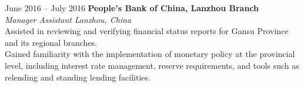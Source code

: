 \documentclass[a4paper,12pt]{article}
\makeatletter
\newenvironment{joblong}[2]
    {
    \begin{tabularx}{\linewidth}{@{}l X r@{}}
    \textbf{#1} & \hfill &  #2 \\[3.75pt]
    \end{tabularx}
    \begin{minipage}[t]{\linewidth}
    \begin{itemize}[nosep,after=\strut, leftmargin=1em, itemsep=3pt,label=--]
    }
    {
    \end{itemize}
    \end{minipage}    
    }
\makeatother
\begin{document}
June 2016 -- July 2016 \hfill \textbf{People’s Bank of China, Lanzhou Branch} \\ %
\textit{Manager Assistant} \hfill \textit{Lanzhou, China} \\
\textbullet Assisted in reviewing and verifying financial status reports for Gansu Province and its regional branches. \\
\textbullet Gained familiarity with the implementation of monetary policy at the provincial level, including interest rate management, reserve requirements, and tools such as relending and standing lending facilities. 







  
\end{document}
